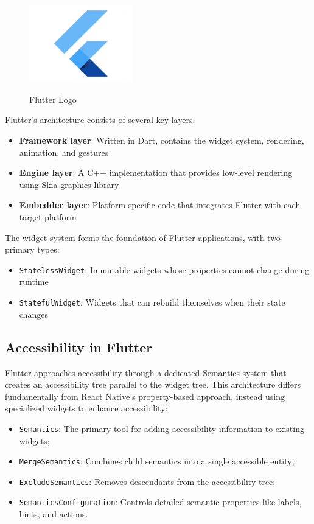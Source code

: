 \begin{figure}[ht]
    \centering
    \includegraphics[width=0.4\textwidth, alt={Flutter Logo}]{img/flutter-logo.jpg}
    \caption{Flutter Logo}
\label{fig:flutter-logo}
\end{figure}


Flutter's architecture consists of several key layers:
\begin{itemize}
    \item \textbf{Framework layer}: Written in Dart, contains the widget system, rendering, animation, and gestures
    \item \textbf{Engine layer}: A C++ implementation that provides low-level rendering using Skia graphics library
    \item \textbf{Embedder layer}: Platform-specific code that integrates Flutter with each target platform
\end{itemize}

The widget system forms the foundation of Flutter applications, with two primary types:
\begin{itemize}
    \item \texttt{StatelessWidget}: Immutable widgets whose properties cannot change during runtime
    \item \texttt{StatefulWidget}: Widgets that can rebuild themselves when their state changes
\end{itemize}

\subsection{Accessibility in Flutter}
Flutter approaches accessibility through a dedicated Semantics system that creates an accessibility tree parallel to the widget tree. This architecture differs fundamentally from React Native's property-based approach, instead using specialized widgets to enhance accessibility:

\begin{itemize}
    \item \texttt{Semantics}: The primary tool for adding accessibility information to existing widgets;
    \item \texttt{MergeSemantics}: Combines child semantics into a single accessible entity;
    \item \texttt{ExcludeSemantics}: Removes descendants from the accessibility tree;
    \item \texttt{SemanticsConfiguration}: Controls detailed semantic properties like labels, hints, and actions.
\end{itemize}

